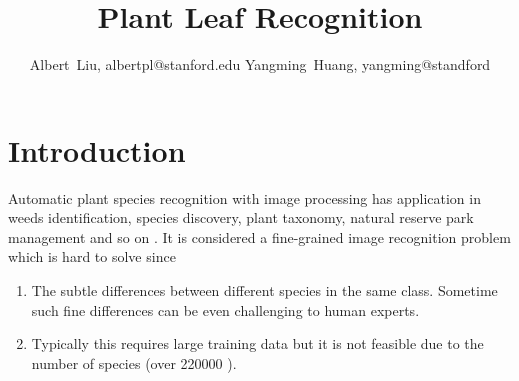 \documentclass[journal, 10pt]{IEEEtran}
\begin{document}
%
\title{Plant Leaf Recognition}
%
%
%
\author{Albert~Liu, albertpl@stanford.edu
        Yangming~Huang, yangming@standford}%

%
%


\maketitle

\section{Introduction}
Automatic plant species recognition with image processing has application in weeds identification, species discovery, plant taxonomy, natural reserve park management and so on \cite{Pedro13}.  It is considered a fine-grained image recognition problem which is hard to solve since
\begin{enumerate}
  \item The subtle differences between different species in the same class. Sometime such fine differences can be even challenging to human experts.
  \item Typically this requires large training data but it is not feasible due to the number of species (over 220000 \cite{Charles13}).
\end{enumerate}
\end{document}
